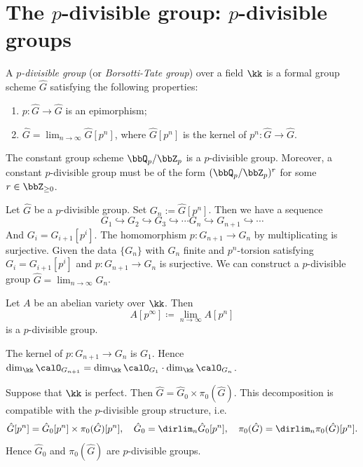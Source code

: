 \section[The p-divisible group: p-divisible groups]{The $p$-divisible group: $p$-divisible groups}

\begin{definition}
	A \emph{$p$-divisible group} (or \emph{Borsotti-Tate group}) over a field $\kk$ is a formal group scheme $\hat{G}$ satisfying the following properties:
	\begin{enumerate}
		\item $p: \hat{G} \to \hat{G}$ is an epimorphism;
		\item $\hat{G} = \lim_{n \to \infty} \hat{G}[p^n]$, where $\hat{G}[p^n]$ is the kernel of $p^n: \hat{G} \to \hat{G}$.
	\end{enumerate}
\end{definition}

\begin{example}
	The constant group scheme $\bbQ_p/\bbZ_p$ is a $p$-divisible group.
	Moreover, a constant $p$-divisible group must be of the form $(\bbQ_p/\bbZ_p)^r$ for some $r \in \bbZ_{\ge 0}$.
\end{example}

Let $\hat{G}$ be a $p$-divisible group.
Set $G_n := \hat{G}[p^n]$.
Then we have a sequence
\[ G_1 \hookrightarrow G_2 \hookrightarrow G_3 \hookrightarrow \cdots G_n \hookrightarrow G_{n+1} \hookrightarrow \cdots \]
And $G_i = G_{i+1}[p^i]$.
The homomorphism $p: G_{n+1} \to G_n$ by multiplicating is surjective.
Given the data $\{G_n\}$ with $G_n$ finite and $p^n$-torsion satisfying $G_i = G_{i+1}[p^i]$ and $p: G_{n+1} \to G_n$ is surjective.
We can construct a $p$-divisible group $\hat{G} = \lim_{n \to \infty} G_n$.

\begin{example}
	Let $A$ be an abelian variety over $\kk$.
	Then
	\[ A[p^\infty] \coloneqq \lim_{n \to \infty} A[p^n] \]
	is a $p$-divisible group.
\end{example}

The kernel of $p: G_{n+1} \to G_n$ is $G_1$.
Hence $\dim_\kk \calO_{G_{n+1}} = \dim_\kk \calO_{G_1} \cdot \dim_\kk \calO_{G_n}$.

Suppose that $\kk$ is perfect.
Then $\hat{G} = \hat{G}_0 \times \pi_0(\hat{G})$.
This decomposition is compatible with the $p$-divisible group structure, i.e.
\[ \hat{G}[p^n] = \hat{G}_0[p^n] \times \pi_0(\hat{G})[p^n], \quad \hat{G}_0 = \dirlim_n \hat{G}_0[p^n], \quad \pi_0(\hat{G}) = \dirlim_n \pi_0(\hat{G})[p^n]. \]
Hence $\hat{G}_0$ and $\pi_0(\hat{G})$ are $p$-divisible groups.

